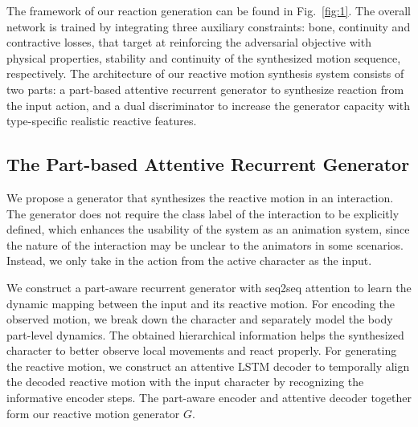 \documentclass[times,twocolumn,final]{elsarticle}
\begin{document}
The framework of our reaction generation can be found in Fig.~\ref{fig:1}. The overall network is trained by integrating three auxiliary constraints: bone, continuity and contractive losses, that target at reinforcing the adversarial objective with physical properties, stability and continuity of the synthesized motion sequence, respectively. The architecture of our reactive motion synthesis system consists of two parts: a part-based attentive recurrent generator to synthesize reaction from the input action, and a dual discriminator to increase the generator capacity with type-specific realistic reactive features. 

\subsection{The Part-based Attentive Recurrent Generator}
\label{sec:3.1}
We propose a generator that synthesizes the reactive motion in an interaction. The generator does not require the class label of the interaction to be explicitly defined, which enhances the usability of the system as an animation system, since the nature of the interaction may be unclear to the animators in some scenarios. Instead, we only take in the action from the active character as the input.



We construct a part-aware recurrent generator with seq2seq attention to learn the dynamic mapping between the input and its reactive motion. For encoding the observed motion, we break down the character and separately model the body part-level dynamics. The obtained hierarchical information helps the synthesized character to better observe local movements and react properly. For generating the reactive motion, we construct an attentive LSTM decoder to temporally align the decoded reactive motion with the input character by recognizing the informative encoder steps. The part-aware encoder and attentive decoder together form our reactive motion generator $G$.
\end{document}
